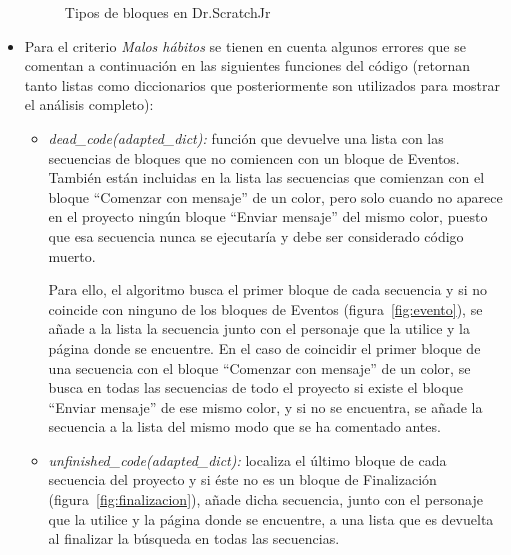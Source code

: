 \documentclass[a4paper, 12pt]{book}
\begin{document}
\begin{itemize}
\begin{figure}[H]
     \caption{Tipos de bloques en Dr.ScratchJr} \label{fig:bloques}
    \end{figure}
    \newpage
    
    \item Para el criterio \emph{Malos hábitos} se tienen en cuenta algunos errores que se comentan a continuación en las siguientes funciones del código (retornan tanto listas como diccionarios que posteriormente son utilizados para mostrar el análisis completo):
     \begin{itemize}
        \item \emph{dead\_code(adapted\_dict):} función que devuelve una lista con las secuencias de bloques que no comiencen con un bloque de Eventos.
        También están incluidas en la lista las secuencias que comienzan con el bloque ``Comenzar con mensaje'' de un color, pero solo cuando no aparece en el proyecto ningún bloque ``Enviar mensaje'' del mismo color, puesto que esa secuencia nunca se ejecutaría y debe ser considerado código muerto.
        
        \vspace{5mm}
        Para ello, el algoritmo busca el primer bloque de cada secuencia y si no coincide con ninguno de los bloques de Eventos (figura~\ref{fig:evento}), se añade a la lista la secuencia junto con el personaje que la utilice y la página donde se encuentre.
        En el caso de coincidir el primer bloque de una secuencia con el bloque ``Comenzar con mensaje'' de un color, se busca en todas las secuencias de todo el proyecto si existe el bloque ``Enviar mensaje'' de ese mismo color, y si no se encuentra, se añade la secuencia a la lista del mismo modo que se ha comentado antes.

        \item \emph{unfinished\_code(adapted\_dict):} localiza el último bloque de cada secuencia del proyecto y si éste no es un bloque de Finalización (figura~\ref{fig:finalizacion}), añade dicha secuencia, junto con el personaje que la utilice y la página donde se encuentre, a una lista que es devuelta al finalizar la búsqueda en todas las secuencias.


\end{itemize}
\end{itemize}
\end{document}
